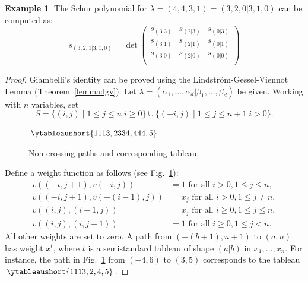 \documentclass[11pt]{amsproc}
\theoremstyle{definition}
\theoremstyle{example}
\newtheorem{example}[theorem]{Example}
\begin{document}
\begin{example}
  The Schur polynomial for $\lambda=(4,4,3,1)=(3,2,0|3,1,0)$ can be computed as:
  \begin{displaymath}
    s_{(3,2,1|3,1,0)} = \det
    \begin{pmatrix}
      s_{(3|3)} & s_{(2|3)} & s_{(0|3)}\\
      s_{(3|1)} & s_{(2|1)} & s_{(0|1)}\\
      s_{(3|0)} & s_{(2|0)} & s_{(0|0)}\\
    \end{pmatrix}
  \end{displaymath}
\end{example}
\begin{proof}
  Giambelli's identity can be proved using the Lindstr\"om-Gessel-Viennot Lemma (Theorem~\ref{lemma:lgv}).
  Let $\lambda=(\alpha_1,\dotsc,\alpha_d|\beta_1,\dotsc,\beta_d)$ be given.
  Working with $n$ variables, set
  \begin{displaymath}
    S = \{(i,j)\mid 1\leq j \leq n\; i\geq 0\} \cup \{(-i,j)\mid 1\leq j\leq n+1\; i>0\}.
  \end{displaymath}
  \begin{figure}[h]
    \centering
    \hspace{1cm}$\ytableaushort{1113,2334,444,5}$
    \caption{Non-crossing paths and corresponding tableau.}
    \label{fig:giambelli}
  \end{figure}
  Define a weight function as follows (see Fig.~\ref{fig:giambelli}):
  \begin{align*}
    v((-i,j+1), v(-i,j)) & = 1 \text{ for all } i> 0, 1 \leq j \leq n,\\
    v((-i,j+1), v(-(i-1),j)) & = x_j \text{ for all } i>0, 1\leq j\neq n,\\
    v((i,j), (i+1,j)) & = x_j \text{ for all } i\geq 0, 1\leq j\leq n,\\
    v((i,j),(i,j+1)) & = 1 \text{ for all } i\geq 0, 1\leq j < n.
  \end{align*}
  All other weights are set to zero.
  A path from $(-(b+1),n+1)$ to $(a,n)$ has weight $x^t$, where $t$ is a semistandard tableau of shape $(a|b)$ in $x_1,\dotsc,x_n$.
  For instance, the path in Fig.~\ref{fig:giambelli} from $(-4,6)$ to $(3,5)$ corresponds to the tableau $\ytableaushort{1113,2,4,5}$.


\end{proof}
\end{document}
